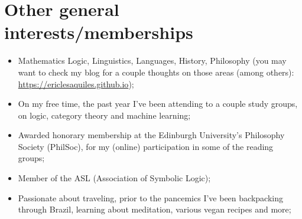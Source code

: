 \documentclass[11pt,a4paper,sans]{moderncv}        %
\begin{document}
\section{Other general interests/memberships}
\begin{itemize}
\item Mathematics Logic, Linguistics, Languages, History, Philosophy (you may want to check my blog
  for a couple thoughts on those areas (among others): \url{https://ericlesaquiles.github.io});
\item On my free time, the past year I've been attending to a couple study groups, on logic, category theory and machine
  learning;
\item Awarded honorary membership at the Edinburgh University's Philosophy Society (PhilSoc), for
  my (online) participation in some of the reading groups;
\item Member of the ASL (Association of Symbolic Logic);
\item Passionate about traveling, prior to the pancemics I've been backpacking
  through Brazil, learning about meditation, various vegan recipes and more;
\end{itemize}





\end{document}

